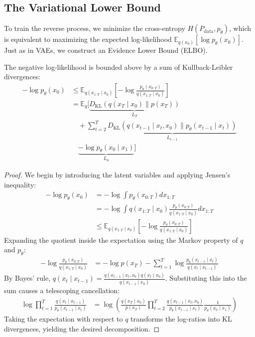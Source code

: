 \subsection{The Variational Lower Bound}
To train the reverse process, we minimize the cross-entropy $H(P_{\text{data}}, p_\theta)$, which is equivalent to maximizing the expected log-likelihood $\mathbb{E}_{q(x_0)}[\log p_\theta(x_0)]$. Just as in VAEs, we construct an Evidence Lower Bound (ELBO).

\begin{theorem}
The negative log-likelihood is bounded above by a sum of Kullback-Leibler divergences:
\begin{align}
    -\log p_\theta(x_0) &\le \mathbb{E}_{q(x_{1:T} \mid x_0)} \left[ -\log \frac{p_\theta(x_{0:T})}{q(x_{1:T} \mid x_0)} \right] \nonumber \\
    &= \mathbb{E}_{q} \Bigg[ \underbrace{D_{\text{KL}}(q(x_T \mid x_0) \parallel p(x_T))}_{L_T} \nonumber \\
    &\quad + \sum_{t=2}^T \underbrace{D_{\text{KL}}(q(x_{t-1} \mid x_t, x_0) \parallel p_\theta(x_{t-1} \mid x_t))}_{L_{t-1}} \nonumber \\
    &\quad \underbrace{- \log p_\theta(x_0 \mid x_1)}_{L_0} \Bigg]
\end{align}
\end{theorem}

\begin{proof}
We begin by introducing the latent variables and applying Jensen's inequality:
\begin{align*}
    -\log p_\theta(x_0) &= -\log \int p_\theta(x_{0:T}) dx_{1:T} \\
                        &= -\log \int q(x_{1:T} \mid x_0) \frac{p_\theta(x_{0:T})}{q(x_{1:T} \mid x_0)} dx_{1:T} \\
                        &\le \mathbb{E}_{q(x_{1:T} \mid x_0)} \left[ -\log \frac{p_\theta(x_{0:T})}{q(x_{1:T} \mid x_0)} \right]
\end{align*}
Expanding the quotient inside the expectation using the Markov property of $q$ and $p_\theta$:
\begin{align*}
    -\log \frac{p_\theta(x_{0:T})}{q(x_{1:T} \mid x_0)} &= -\log p(x_T) - \sum_{t=1}^T \log \frac{p_\theta(x_{t-1} \mid x_t)}{q(x_t \mid x_{t-1})}
\end{align*}
By Bayes' rule, $q(x_t \mid x_{t-1}) = \frac{q(x_{t-1} \mid x_t, x_0) q(x_t \mid x_0)}{q(x_{t-1} \mid x_0)}$. Substituting this into the sum causes a telescoping cancellation:
\begin{align*}
    \log \prod_{t=1}^T \frac{q(x_t \mid x_{t-1})}{p_\theta(x_{t-1} \mid x_t)} &= \log \left( \frac{q(x_T \mid x_0)}{p(x_T)} \prod_{t=2}^T \frac{q(x_{t-1} \mid x_t, x_0)}{p_\theta(x_{t-1} \mid x_t)} \frac{1}{p_\theta(x_0 \mid x_1)} \right)
\end{align*}
Taking the expectation with respect to $q$ transforms the log-ratios into KL divergences, yielding the desired decomposition.
\end{proof}

